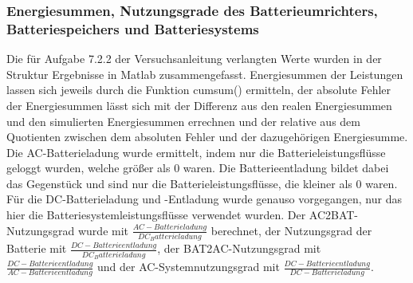 \subsubsection{Energiesummen, Nutzungsgrade des Batterieumrichters,
Batteriespeichers und Batteriesystems}
Die für Aufgabe 7.2.2 der Versuchsanleitung \cite[S. 11]{Laboranleitung} verlangten Werte wurden in der Struktur Ergebnisse in Matlab zusammengefasst.
Energiesummen der Leistungen lassen sich jeweils durch die Funktion cumsum() ermitteln, der absolute Fehler der Energiesummen lässt sich mit der Differenz aus den realen Energiesummen und den simulierten Energiesummen errechnen und der relative aus dem Quotienten zwischen dem absoluten Fehler und der dazugehörigen Energiesumme.
Die AC-Batterieladung wurde ermittelt, indem nur die Batterieleistungsflüsse geloggt wurden, welche größer als 0 waren.
Die Batterieentladung bildet dabei das Gegenstück und sind nur die Batterieleistungsflüsse, die kleiner als 0 waren.
Für die DC-Batterieladung und -Entladung wurde genauso vorgegangen, nur das hier die Batteriesystemleistungsflüsse verwendet wurden.
Der AC2BAT-Nutzungsgrad wurde mit $\frac{AC-Batterieladung}{DC_Batterieladung}$ berechnet, der Nutzungsgrad der Batterie mit $\frac{DC-Batterieentladung}{DC_Batterieladung}$, der BAT2AC-Nutzungsgrad mit $\frac{DC-Batterieentladung}{AC-Batterieentladung}$ und der AC-Systemnutzungsgrad mit $\frac{DC-Batterieentladung}{DC-Batterieladung}$.
\\
